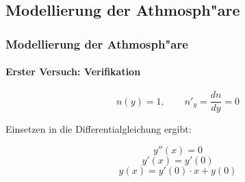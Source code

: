 \documentclass{beamer}
\begin{document}
  \subsection{Modellierung der Athmosph"are}
  \begin{frame}
    \frametitle{Modellierung der Athmosph"are}
    \framesubtitle{Erster Versuch: Verifikation}

    
    $$n(y) = 1, \qquad n'_y = \frac{d n}{d y} = 0$$
    
    Einsetzen in die Differentialgleichung ergibt:
    
    $$y''(x) = 0$$ 
    $$y'(x) = y'(0)$$ 
    $$y(x) = y'(0) \cdot x + y(0)$$
    
  \end{frame}
  
\end{document}

